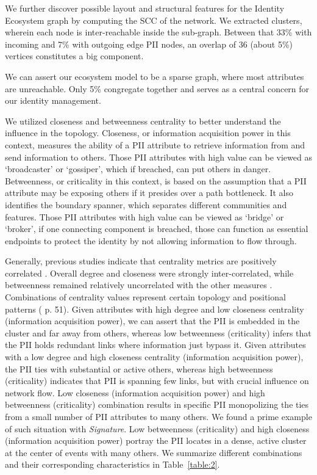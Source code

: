 \documentclass[conference]{IEEEtran}
\begin{document}
We further discover possible layout and structural features for the Identity Ecosystem graph by computing the SCC of the network. We extracted clusters, wherein each node is inter-reachable inside the sub-graph. Between that 33\% with incoming and 7\% with outgoing edge PII nodes, an overlap of 36 (about 5\%) vertices constitutes a big component. 

We can assert our ecosystem model to be a sparse graph, where most attributes are unreachable. Only 5\% congregate together and serves as a central concern for our identity management.

We utilized closeness and betweenness centrality to better understand the influence in the topology.  Closeness, or information acquisition power in this context,  measures the ability of a PII attribute to retrieve information from and send information to others. Those PII attributes with high value can be viewed as `broadcaster' or `gossiper', which if breached, can put others in danger. Betweenness, or criticality in this context, is based on the assumption that a PII attribute may be exposing others if it presides over a path bottleneck. It also identifies the boundary spanner, which separates different communities and features. Those PII attributes with high value can be viewed as `bridge' or `broker', if one connecting component is breached, those can function as essential endpoints to protect the identity by not allowing information to flow through. 

Generally, previous studies indicate that centrality metrics are positively correlated \cite{Correlated} \cite{CorrelationCoefficient}. 
Overall degree and closeness were strongly inter-correlated, while betweenness remained relatively uncorrelated with the other measures \cite{Bolland}. Combinations of centrality values represent certain topology and positional patterns (\cite{Donglei} p. 51). Given attributes with high degree and low closeness centrality (information acquisition power), we can assert that the PII is embedded in the cluster and far away from others, whereas low betweenness (criticality) infers that the PII holds redundant links where information just bypass it. Given attributes with a low degree and high closeness centrality (information acquisition power), the PII ties with substantial or active others, whereas high betweenness (criticality) indicates that PII is spanning few links, but with crucial influence on network flow. Low closeness (information acquisition power) and high betweenness (criticality) combination results in specific PII monopolizing the ties from a small number of PII attributes to many others. We found a  prime example of such situation with {\it Signature}. Low betweenness (criticality) and high closeness (information acquisition power) portray the PII locates in a dense, active cluster at the center of events with many others. We summarize different combinations and their corresponding characteristics in Table~\ref{table:2}.
\end{document}
